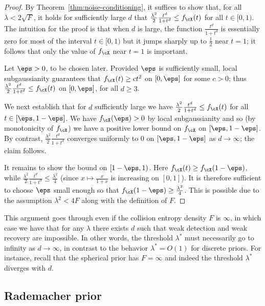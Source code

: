 \documentclass{article}
\begin{document}
\begin{proof}
By Theorem~\ref{thm:noise-conditioning}, it suffices to show that, for all $\lambda < 2\sqrt{F}$, it holds for sufficiently large $d$ that $\frac{\lambda^2}{2} \frac{t^d}{1+t^d} \le f_\cX(t)$ for all  $t \in [0,1)$. The intuition for the proof is that when $d$ is large, the function $\frac{t^d}{1+t^d}$ is essentially zero for most of the interval $t \in [0,1)$ but it jumps sharply up to $\frac{1}{2}$ near $t=1$; it follows that only the value of $f_\cX$ near $t=1$ is important.

Let $\eps > 0$, to be chosen later. Provided $\eps$ is sufficiently small, local subgaussianity guarantees that $f_\cX(t) \geq c t^2$ on $[0,\eps]$ for some $c > 0$; thus $\frac{\lambda^2}{2} \frac{t^d}{1+t^d} \le f_\cX(t)$ on $[0,\eps]$, for all $d \geq 3$.

We next establish that for $d$ sufficiently large we have $\frac{\lambda^2}{2} \frac{t^d}{1+t^d} \le f_\cX(t)$ for all $t \in [\eps,1-\eps]$. We have $f_\cX(\eps) > 0$ by local subgaussianity and so (by monotonicity of $f_\cX$) we have a positive lower bound on $f_\cX$ on $[\eps,1-\eps]$. By contrast, $\frac{\lambda^2}{2} \frac{t^d}{1+t^d}$ converges uniformly to $0$ on $[\eps,1-\eps]$ as $d\to\infty$; the claim follows.

It remains to show the bound on $[1-\eps,1)$. Here $f_\cX(t) \geq f_\cX(1-\eps)$, while $\frac{\lambda^2}{2} \frac{t^d}{1+t^d} \leq \frac{\lambda^2}{4}$ (since $x \mapsto \frac{x}{1+x}$ is increasing on $[0,1]$). It is therefore sufficient to choose $\eps$ small enough so that $f_\cX(1-\eps) \ge \frac{\lambda^2}{4}$. This is possible due to the assumption $\lambda^2 < 4 F$ along with the definition of $F$.
\end{proof}



\begin{remark}This argument goes through even if the collision entropy density $F$ is $\infty$, in which case we have that for any $\lambda$ there exists $d$ such that weak detection and weak recovery are impossible. In other words, the threshold $\lambda^*$ must necessarily go to infinity as $d\to\infty$, in contrast to the behavior $\lambda^* = O(1)$ for discrete priors. For instance, recall that the spherical prior has $F = \infty$ and indeed the threshold $\lambda^*$ diverges with $d$.
\end{remark}


\subsection{Rademacher prior}
\end{document}
